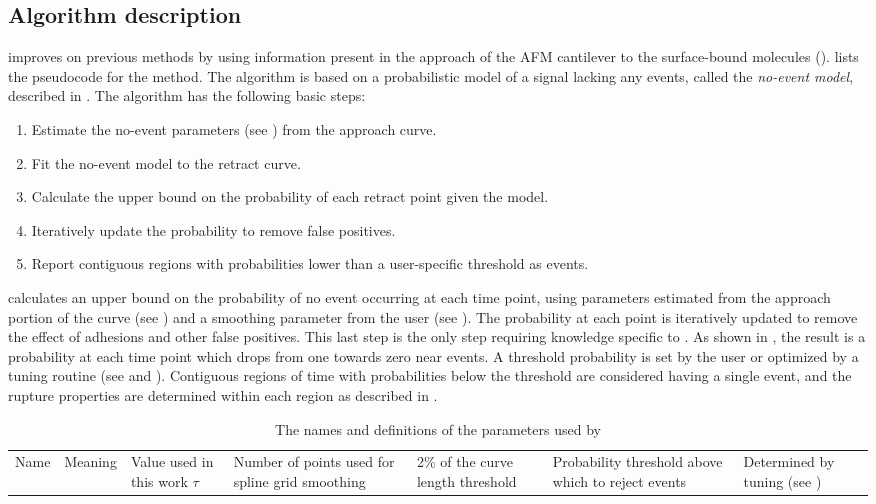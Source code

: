 \subsection{Algorithm description}

\name{} improves on previous methods by using information present in the approach of the AFM cantilever to the surface-bound molecules ().   lists the pseudocode for the method. The algorithm is based on a probabilistic model of a signal lacking any events, called the \textit{no-event model}, described in . The algorithm has the following basic steps:

\begin{enumerate}
\item Estimate the no-event parameters (see ) from the approach curve.
\item Fit the no-event model to the retract curve.
\item Calculate the upper bound on the probability of each retract point given the model.
\item Iteratively update the probability to remove false positives.
\item Report contiguous regions with probabilities lower than a user-specific threshold as events.
\end{enumerate}

 \name{} calculates an upper bound on the probability of no event occurring at each time point, using parameters estimated from the approach portion of the curve (see ) and a smoothing parameter from the user (see ). The probability at each point is iteratively updated to remove the effect of adhesions and other false positives. This last step is the only step requiring knowledge specific to \singlemol{}. As shown in , the result is a probability at each time point which drops from one towards zero near events. A threshold probability is set by the user or optimized by a tuning routine (see  and ). Contiguous regions of time with probabilities below the threshold are considered having a single event, and the rupture properties are determined within each region as described in .


\begin{table}
\caption[Algorithm parameters]{ The names and definitions of the parameters used by \name{}}
\begin{tabularx}{\textwidth}{ l | l | l | l  }
\hline \hline
Name & Meaning  & Value used in this work \e
$\tau$ & Number of points used for spline grid smoothing & 2\% of the curve length \e
threshold & Probability threshold above which to reject events  & Determined by tuning (see ) \e
\end{tabularx}
\end{table}


